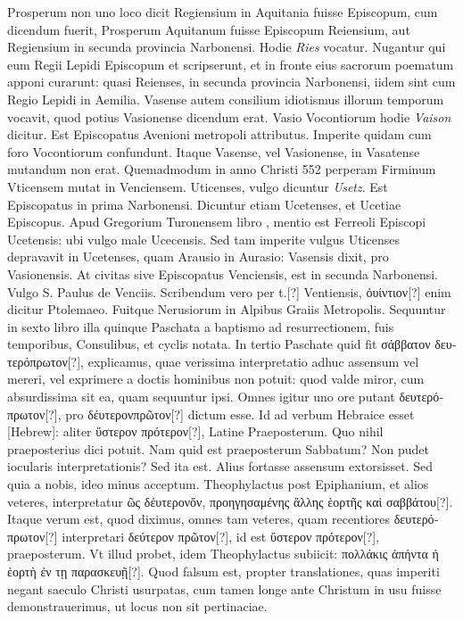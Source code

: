Prosperum non uno
loco dicit Regiensium in Aquitania fuisse Episcopum, cum dicendum
fuerit, Prosperum Aquitanum fuisse Episcopum Reiensium,
aut Regiensium in secunda provincia Narbonensi.
Hodie \textit{Ries} vocatur.
Nugantur qui eum Regii Lepidi Episcopum et scripserunt,
et in fronte eius sacrorum poematum apponi curarunt: quasi Reienses,
in secunda provincia Narbonensi, iidem sint cum Regio Lepidi
in Aemilia.
Vasense autem consilium idiotismus illorum temporum
vocavit, quod potius Vasionense dicendum erat.
Vasio Vocontiorum hodie \textit{Vaison} dicitur.
Est Episcopatus Avenioni metropoli
attributus.
Imperite quidam cum foro Vocontiorum confundunt.
Itaque Vasense, vel Vasionense, in Vasatense mutandum non
erat.
Quemadmodum in anno Christi 552 perperam Firminum
Vticensem mutat in Venciensem.
Uticenses, vulgo dicuntur \textit{Usetz}.
Est Episcopatus in prima Narbonensi.
Dicuntur etiam Ucetenses,
et Ucetiae Episcopus.
Apud Gregorium Turonensem libro ,
mentio est Ferreoli Episcopi Ucetensis: ubi vulgo male Ucecensis.
Sed tam imperite vulgus Uticenses depravavit in Ucetenses, quam
Arausio in Aurasio: Vasensis dixit, pro Vasionensis.
At civitas sive
Episcopatus Venciensis, est in secunda Narbonensi. Vulgo S. Paulus
de Venciis.
Scribendum vero per t.[?] Ventiensis,
 \textgreek{ὀυίντιον[?]} enim dicitur
Ptolemaeo.
Fuitque Nerusiorum in Alpibus Graiis Metropolis.
Sequuntur in sexto libro illa quinque Paschata a baptismo
ad resurrectionem, fuis temporibus, Consulibus, et cyclis notata.
In tertio Paschate quid fit
 \textgreek{σάββατον δευτερόπρωτον[?]}, explicamus,
quae verissima interpretatio adhuc assensum vel mereri, vel
exprimere a doctis hominibus non potuit: quod valde miror,
cum absurdissima sit ea, quam sequuntur ipsi.
Omnes igitur uno
ore putant \textgreek{δευτερόπρωτον[?]},
 pro \textgreek{δέυτερονπρῶτον[?]} dictum esse.
Id ad verbum
Hebraice esset \texthebrew{[Hebrew]}:
 aliter \textgreek{ὕστερον πρότερον[?]}, Latine Praeposterum.
Quo nihil praeposterius dici potuit.
Nam quid est praeposterum Sabbatum?
Non pudet iocularis interpretationis?
Sed ita est.
Alius fortasse assensum extorsisset.
Sed quia a nobis, ideo
minus acceptum.
Theophylactus post Epiphanium, et alios veteres,
interpretatur \textgreek{ῶς δέυτερονὄν,
 προηγησαμένης ἄλλης ἑορτῆς καὶ σαββάτου[?]}.
Itaque verum est, quod diximus, omnes tam veteres, quam
recentiores \textgreek{δευτερόπρωτον[?]} interpretari
 \textgreek{δεύτερον πρῶτον[?]}, id est \textgreek{ὕστερον
πρότερον[?]},
praeposterum.
Vt illud probet, idem Theophylactus
subiicit: \textgreek{πολλάκις ἀπήντα ἡ ἑορτὴ ἐν τῃ παρασκευῇ[?]}.
Quod falsum est,
propter translationes, quas imperiti negant saeculo Christi usurpatas,
cum tamen longe ante Christum in usu fuisse demonstrauerimus,
ut locus non sit pertinaciae.

